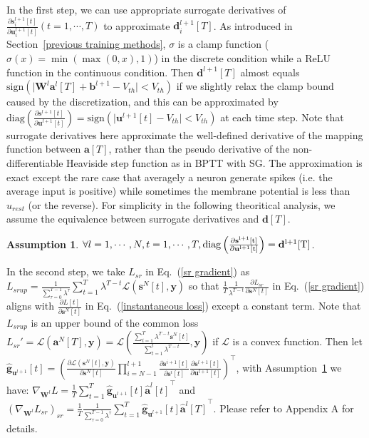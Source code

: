 \documentclass{article}
\begin{document}
In the first step, we can use appropriate surrogate derivatives of $\frac{\partial \mathbf{s}^{l+1}_i[t]}{\partial \mathbf{u}^{l+1}_i[t]} (t=1,\cdots,T)$ to approximate $\mathbf{d}^{l+1}_i[T]$. As introduced in Section~\ref{previous training methods}, $\sigma$ is a clamp function ($\sigma(x)=\min(\max(0, x), 1)$) in the discrete condition while a ReLU function in the continuous condition. Then $\mathbf{d}^{l+1}[T]$ almost equals $\text{sign}\left(\lvert \mathbf{W}^l\mathbf{a}^l[T]+\mathbf{b}^{l+1} - V_{th} \rvert < V_{th}\right)$ if we slightly relax the clamp bound caused by the discretization, and this can be approximated by $\text{diag}\left(\frac{\partial \mathbf{s}^{l+1}[t]}{\partial \mathbf{u}^{l+1}[t]}\right)=\text{sign}\left(\lvert \mathbf{u}^{l+1}[t] - V_{th} \rvert < V_{th}\right)$ at each time step. 
Note that surrogate derivatives here approximate the well-defined derivative of the mapping function between $\mathbf{a}[T]$, rather than the pseudo derivative of the non-differentiable Heaviside step function as in BPTT with SG. The approximation is exact except the rare case that averagely a neuron generate spikes (i.e. the average input is positive) while sometimes the membrane potential is less than $u_{rest}$ (or the reverse). For simplicity in the following theoritical analysis, we assume the equivalence between surrogate derivatives and $\mathbf{d}[T]$.
\newtheorem{assumption}{\bf Assumption}
\begin{assumption}\label{assumption1}
$\forall l=1,\cdots,N, t=1,\cdots,T, \rm{diag}\left(\frac{\partial \mathbf{s}^{l+1}[t]}{\partial \mathbf{u}^{l+1}[t]}\right) = \mathbf{d}^{l+1}[T]$.
\end{assumption}

In the second step, we take $L_{sr}$ in Eq.~(\ref{sr gradient}) as $L_{srup}=\frac{1}{\sum_{\tau=0}^{T-1}\lambda^\tau}\sum_{t=1}^T\lambda^{T-t}\mathcal{L}(\mathbf{s}^N[t], \mathbf{y})$ so that $\frac{1}{T}\frac{1}{\lambda^{T-t}}\frac{\partial L_{sr}}{\partial \mathbf{s}^N[t]}$ in Eq.~(\ref{sr gradient}) aligns with $\frac{\partial L[t]}{\partial \mathbf{s}^N[t]}$ in Eq.~(\ref{instantaneous loss}) except a constant term. Note that $L_{srup}$ is an upper bound of the common loss $L_{sr}'=\mathcal{L}(\mathbf{a}^N[T], \mathbf{y})=\mathcal{L}(\frac{\sum_{t=1}^T \lambda^{T-t}\mathbf{s}^N[t]}{\sum_{t=1}^t \lambda^{T-t}}, \mathbf{y})$ if $\mathcal{L}$ is a convex function. 
Then let $\hat{\mathbf{g}}_{\mathbf{u}^{l+1}}[t]=\left(\frac{\partial \mathcal{L}(\mathbf{s}^N[t], \mathbf{y})}{\partial \mathbf{s}^N[t]}\prod_{i=N-1}^{l+1}\frac{\partial \mathbf{s}^{i+1}[t]}{\partial \mathbf{s}^i[t]} \frac{\partial \mathbf{s}^{l+1}[t]}{\partial \mathbf{u}^{l+1}[t]}\right)^\top$, with Assumption~\ref{assumption1} we have: $\nabla_{\mathbf{W}^l}L = \frac{1}{T} \sum_{t=1}^T \hat{\mathbf{g}}_{\mathbf{u}^{l+1}}[t] {\hat{\mathbf{a}}^l[t]}^\top$ and $\left(\nabla_{\mathbf{W}^l}L_{sr}\right)_{sr}=\frac{1}{T}\frac{1}{\sum_{\tau=0}^{T-1}\lambda^\tau}\sum_{t=1}^T\hat{\mathbf{g}}_{\mathbf{u}^{l+1}}[t] {\hat{\mathbf{a}}^l[T]}^\top$. Please refer to Appendix A for details.
\end{document}
